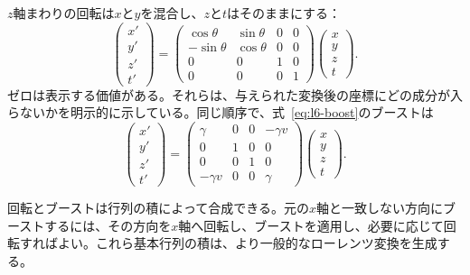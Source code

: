 \(z\)軸まわりの回転は\(x\)と\(y\)を混合し、\(z\)と\(t\)はそのままにする：
\begin{equation}
\begin{pmatrix}
  x'\\ y'\\ z'\\ t'
\end{pmatrix}
=
\begin{pmatrix}
  \cos\theta & \sin\theta & 0 & 0\\
  -\sin\theta & \cos\theta & 0 & 0\\
  0 & 0 & 1 & 0\\
  0 & 0 & 0 & 1
\end{pmatrix}
\begin{pmatrix}
  x\\ y\\ z\\ t
\end{pmatrix}.
\end{equation}
ゼロは表示する価値がある。それらは、与えられた変換後の座標にどの成分が入らないかを明示的に示している。同じ順序で、式~\eqref{eq:l6-boost}のブーストは
\begin{equation}
\begin{pmatrix}
  x'\\ y'\\ z'\\ t'
\end{pmatrix}
=
\begin{pmatrix}
  \gamma & 0 & 0 & -\gamma v\\
  0 & 1 & 0 & 0\\
  0 & 0 & 1 & 0\\
  -\gamma v & 0 & 0 & \gamma
\end{pmatrix}
\begin{pmatrix}
  x\\ y\\ z\\ t
\end{pmatrix}.
\end{equation}

回転とブーストは行列の積によって合成できる。元の\(x\)軸と一致しない方向にブーストするには、その方向を\(x\)軸へ回転し、ブーストを適用し、必要に応じて回転すればよい。これら基本行列の積は、より一般的なローレンツ変換を生成する。

\begin{classroomqa}
\end{classroomqa}


